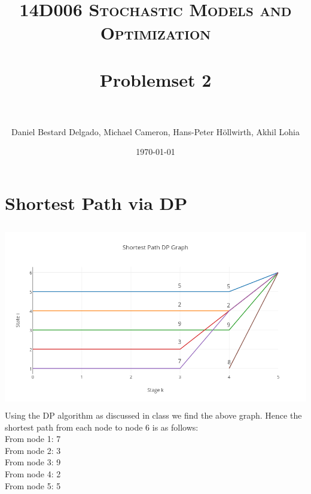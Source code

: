 \documentclass[11pt, oneside]{article}   	%
\title{	
\normalfont \normalsize 
\textsc{14D006 Stochastic Models and Optimization} \\ [25pt] %
\horrule{0.5pt} \\[0.4cm] %
\huge Problemset 2\\ %
\horrule{2pt} \\[0.5cm] %
}
\author{Daniel Bestard Delgado, Michael Cameron, Hans-Peter H{\"o}llwirth, Akhil Lohia} %
\date{\normalsize\today} %
\begin{document}
\maketitle


\section{Shortest Path via DP}


\includegraphics[width=14cm, height=8cm]{Plot2.png} \\
Using the DP algorithm as discussed in class we find the above graph. Hence the shortest path from each node to node 6 is as follows: \\
From node 1: 7 \\
From node 2: 3 \\
From node 3: 9 \\
From node 4: 2 \\
From node 5: 5


\end{document}
